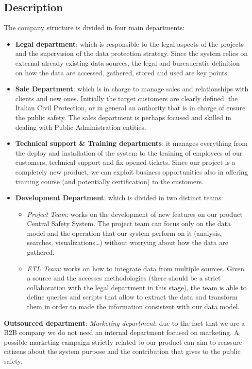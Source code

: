 \documentclass[../main.tex]{subfiles}
\begin{document}
    \subsection{Description}
    The company structure is divided in four main departments:
    \begin{itemize}
        \item \textbf{Legal department}: which is responsible to the legal aspects of the projects and the supervision of the data protection strategy. Since the system relies on external already-existing data sources, the legal and bureaucratic definition on how the data are accessed, gathered, stored and used are key points. 
        \item \textbf{Sale Department}: which is in charge to manage sales and relationships with clients and new ones. Initially the target customers are clearly defined: the Italian Civil Protection, or in general an authority that is in charge of ensure the public safety. The sales department is perhaps focused and skilled in dealing with Public Administration entities.
        \item \textbf{Technical support \& Training departments}: it manages everything from the deploy and installation of the system to the training of employees of our customers, technical support and fix opened tickets. Since our project is a completely new product, we can exploit business opportunities also in offering training course (and potentially certification) to the customers.
        \item \textbf{Development Department}: which is divided in two distinct teams:
        \begin{itemize}
            \item \textit{Project Team}: works on the development of new features on our product Central Safety System. The project team can focus only on the data model and the operation that our system perform on it (analysis, searches, visualizations…) without worrying about how the data are gathered.
            \item \textit{ETL Team}: works on how to integrate data from multiple sources. Given a source and the accesses methodologies (there should be a strict collaboration with the legal department in this stage), the team is able to define queries and scripts that allow to extract the data and transform them in order to made the information consistent with our data model.
        \end{itemize}
    \end{itemize}
    \textbf{Outsourced department}:
    \textit{Marketing department}: due to the fact that we are a B2B company we do not need an internal department focused on marketing. A possible marketing campaign strictly related to our product can aim to reassure citizens about the system purpose and the contribution that gives to the public safety.
\end{document}
